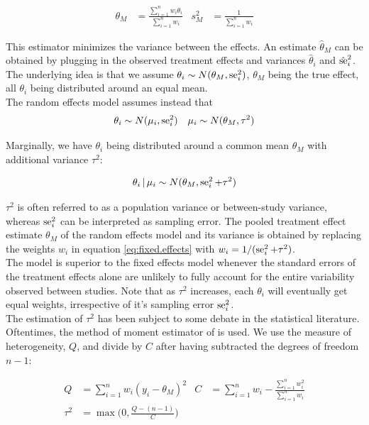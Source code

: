 \documentclass[11pt,a4paper,twoside]{book}\usepackage[]{graphicx}\usepackage[]{color}
\begin{document}
\begin{align}
\theta_M &= \frac{\sum_{i = 1}^n w_i \theta_i}{\sum_{i = 1}^n w_i} &
s_M^2 &= \frac{1}{\sum_{i = 1}^n w_i} \label{eq:fixed.effects}
\end{align}

This estimator minimizes the variance between the effects. An estimate $\hat{\theta}_M$ can be obtained by plugging in the observed treatment effects and variances $\hat{\theta}_i$ and $\hat{\operatorname{se}}_i^2$. The underlying idea is that we assume $\theta_i \sim N(\theta_M, \operatorname{se}_i^2)$, $\theta_M$ being the true effect, all $\theta_i$ being distributed around an equal mean. \\
The random effects model \citep{whitehead} assumes instead that 
\begin{align}
\theta_i \sim N(\mu_i, \operatorname{se}_i^2) &&
\mu_i \sim N(\theta_M, \tau^2) \label{eq:random.effects} 
\end{align}

Marginally, we have $\theta_i$ being distributed around a common mean $\theta_M$ with additional variance $\tau^2$:

\begin{align}
\theta_i \given \mu_i \sim N(\theta_M, \se_i^2 + \tau^2) \nonumber %
\end{align}

$\tau^2$ is often referred to as a population variance or between-study variance, whereas $\operatorname{se}_i^2$ can be interpreted as sampling error. The pooled treatment effect estimate $\theta_M$ of the random effects model and its variance is obtained by replacing the weights $w_i$ in equation \ref{eq:fixed.effects} with $w_i = 1/(\operatorname{se}_i^2 + \tau^2)$. \\
The model is superior to the fixed effects model whenever the standard errors of the treatment effects alone are unlikely to fully account for the entire variability observed between studies. Note that as $\tau^2$ increases, each $\theta_i$ will eventually get equal weights, irrespective of it's sampling error $\operatorname{se}_i^2$.\\
The estimation of $\tau^2$ has been subject to some debate in the statistical literature. Oftentimes, the method of moment estimator of \citet{tau.estimator} is used.
We use the measure of heterogeneity, $Q$, and divide by $C$ after having subtracted the degrees of freedom $n-1$:

\begin{align}
Q &= \sum_{i = 1}^n w_i(y_i - \theta_M)^2 & C &= \sum_{i = 1}^n w_i - \frac{\sum_{i = 1}^n w_i^2}{\sum_{i = 1}^n w_i}\label{eq:Q.heterogeneity} \\
\tau^2 &= \max\big(0, \frac{Q - (n-1)}{C}\big) \label{eq:Tau.definition}
\end{align}
\end{document}
